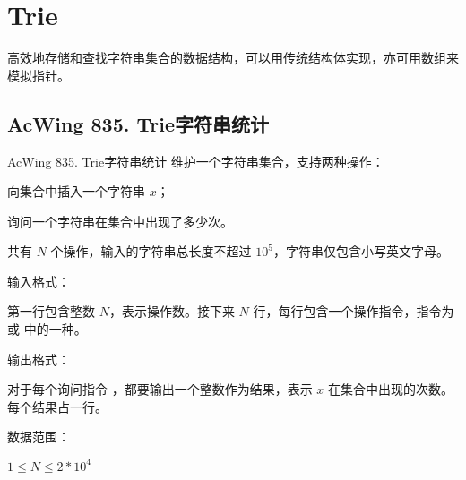 \begin{mycpptwocol}[KMP]

\end{mycpptwocol}


\section{Trie}
高效地存储和查找字符串集合的数据结构，可以用传统结构体实现，亦可用数组来模拟指针。

\subsection{AcWing 835. Trie字符串统计}

\begin{titledbox}{AcWing 835. Trie字符串统计}
    维护一个字符串集合，支持两种操作：

     向集合中插入一个字符串 $x$；

     询问一个字符串在集合中出现了多少次。

    共有 $N$ 个操作，输入的字符串总长度不超过 $10^5$，字符串仅包含小写英文字母。

    输入格式：

    第一行包含整数 $N$，表示操作数。接下来 $N$ 行，每行包含一个操作指令，指令为  或  中的一种。

    输出格式：

    对于每个询问指令 ，都要输出一个整数作为结果，表示 $x$ 在集合中出现的次数。
    每个结果占一行。

    数据范围：

    $1 \le N \le 2*10^4$

    \begin{inputblock}
         \\
         \\
         \\
         \\
         \\
    \end{inputblock}
    \begin{outputblock}
         \\
         \\
    \end{outputblock}
\end{titledbox}

